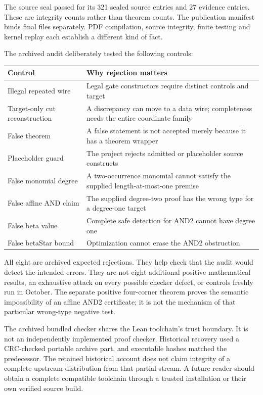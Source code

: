 The source seal passed for its 321 sealed source entries and 27 evidence entries.
These are integrity counts rather than theorem counts. The publication
manifest binds final files separately. PDF compilation, source integrity,
finite testing and kernel replay each establish a different kind of fact.

The archived audit deliberately tested the following controls:

\begin{tabularx}{\textwidth}{@{}>{\raggedright\arraybackslash}p{2.05in}>{\raggedright\arraybackslash}X@{}}\toprule
Control & Why rejection matters\\\midrule
Illegal repeated wire & Legal gate constructors require distinct controls and target\\
Target-only cut reconstruction & A discrepancy can move to a data wire; completeness needs the entire coordinate family\\
False theorem & A false statement is not accepted merely because it has a theorem wrapper\\
Placeholder guard & The project rejects admitted or placeholder source constructs\\
False monomial degree & A two-occurrence monomial cannot satisfy the supplied length-at-most-one premise\\
False affine AND claim & The supplied degree-two proof has the wrong type for a degree-one target\\
False beta value & Complete safe detection for AND2 cannot have degree one\\
False betaStar bound & Optimization cannot erase the AND2 obstruction\\\bottomrule
\end{tabularx}

All eight are archived expected rejections. They help check that the audit
would detect the intended errors. They are not eight additional positive
mathematical results, an exhaustive attack on every possible checker defect,
or controls freshly run in October.
The separate positive four-corner theorem proves the semantic impossibility
of an affine AND2 certificate; it is not the mechanism of that particular
wrong-type negative test.

The archived bundled checker shares the Lean toolchain's trust boundary.
It is not an independently implemented proof checker. Historical recovery
used a CRC-checked portable archive part, and executable hashes matched the
predecessor. The retained historical account does not claim integrity of a
complete upstream distribution from that partial stream. A future reader
should obtain a complete compatible toolchain through a trusted installation
or their own verified source build.

